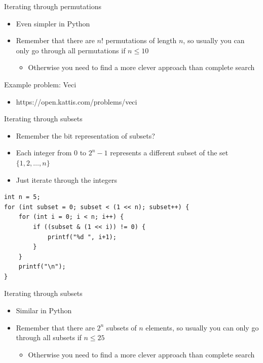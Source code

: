 \documentclass{beamer}
\begin{document}
\begin{frame}[plain]{Iterating through permutations}
    \begin{itemize}
        \item Even simpler in Python
        \vspace{20pt}
        \item Remember that there are $n!$ permutations of length $n$, so usually you can only go through all permutations if $n \leq 10$
            \begin{itemize}
                \item Otherwise you need to find a more clever approach than complete search
            \end{itemize}
            \vspace{20pt}
    \end{itemize}
\end{frame}

\begin{frame}[plain]{Example problem: Veci}
    \begin{itemize}
        \item https://open.kattis.com/problems/veci
    \end{itemize}
\end{frame}

\begin{frame}{Iterating through subsets}
    \begin{itemize}
        \item Remember the bit representation of subsets?
        \item Each integer from $0$ to $2^n - 1$ represents a different subset of the set $\{1,2,\ldots,n\}$
        \item Just iterate through the integers
    \end{itemize}

            \begin{verbatim}
int n = 5;
for (int subset = 0; subset < (1 << n); subset++) {
    for (int i = 0; i < n; i++) {
        if ((subset & (1 << i)) != 0) {
            printf("%d ", i+1);
        }
    }
    printf("\n");
}
            \end{verbatim}
\end{frame}

\begin{frame}[plain]{Iterating through subsets}
    \begin{itemize}
        \item Similar in Python
        \vspace{20pt}
        \item Remember that there are $2^n$ subsets of $n$ elements, so usually you can only go through all subsets if $n \leq 25$
            \begin{itemize}
                \item Otherwise you need to find a more clever approach than complete search
            \end{itemize}
            \vspace{20pt}
    \end{itemize}
\end{frame}
\end{document}
